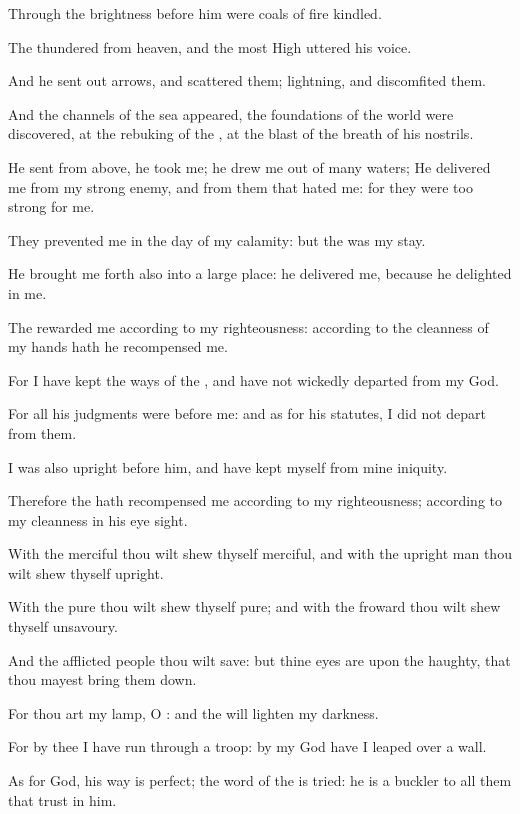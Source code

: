 \Verse Through the brightness before him were coals of fire kindled.

\Verse The \LORD thundered from heaven, and the most High uttered his voice.

\Verse And he sent out arrows, and scattered them; lightning, and discomfited them.

\Verse And the channels of the sea appeared, the foundations of the world were discovered, at the rebuking of the \LORD, at the blast of the breath of his nostrils.

\Verse He sent from above, he took me; he drew me out of many waters; \Verse He delivered me from my strong enemy, and from them that hated me: for they were too strong for me.

\Verse They prevented me in the day of my calamity: but the \LORD was my stay.

\Verse He brought me forth also into a large place: he delivered me, because he delighted in me.

\Verse The \LORD rewarded me according to my righteousness: according to the cleanness of my hands hath he recompensed me.

\Verse For I have kept the ways of the \LORD, and have not wickedly departed from my God.

\Verse For all his judgments were before me: and as for his statutes, I did not depart from them.

\Verse I was also upright before him, and have kept myself from mine iniquity.

\Verse Therefore the \LORD hath recompensed me according to my righteousness; according to my cleanness in his eye sight.

\Verse With the merciful thou wilt shew thyself merciful, and with the upright man thou wilt shew thyself upright.

\Verse With the pure thou wilt shew thyself pure; and with the froward thou wilt shew thyself unsavoury.

\Verse And the afflicted people thou wilt save: but thine eyes are upon the haughty, that thou mayest bring them down.

\Verse For thou art my lamp, O \LORD: and the \LORD will lighten my darkness.

\Verse For by thee I have run through a troop: by my God have I leaped over a wall.

\Verse As for God, his way is perfect; the word of the \LORD is tried: he is a buckler to all them that trust in him.

